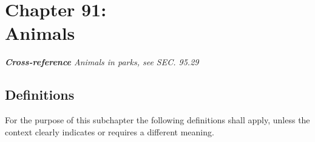 \chapter*{Chapter 91: \\
	Animals}
    \vfill
    \minitoc
    \emph{\textbf{Cross-reference} Animals in parks, see SEC. 95.29}
    \pagebreak


\section{Definitions}
For the purpose of this subchapter the following definitions shall apply, unless the context clearly indicates or requires a different meaning.
